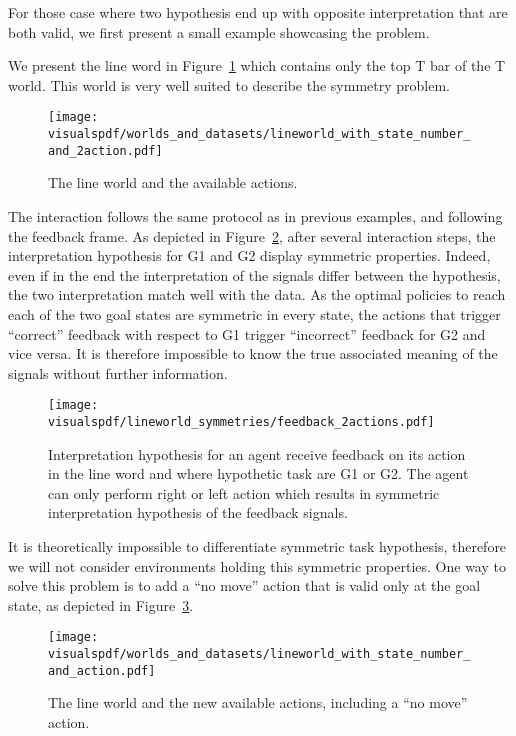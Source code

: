 For those case where two hypothesis end up with opposite interpretation that are both valid, we first present a small example showcasing the problem.

We present the line word in Figure~\ref{fig:lineworld} which contains only the top T bar of the T world. This world is very well suited to describe the symmetry problem. 

\begin{figure}[!htbp]
  \centering
  \texttt{[image: \\visualspdf/worlds\_and\_datasets/lineworld\_with\_state\_number\_and\_2action.pdf]}
  \caption{The line world and the available actions.}
  \label{fig:lineworld}
\end{figure}

The interaction follows the same protocol as in previous examples, and following the feedback frame. As depicted in Figure~\ref{fig:lineworldfeedback2action}, after several interaction steps, the interpretation hypothesis for G1 and G2 display symmetric properties. Indeed, even if in the end the interpretation of the signals differ between the hypothesis, the two interpretation match well with the data. As the optimal policies to reach each of the two goal states are symmetric in every state, the actions that trigger ``correct'' feedback with respect to G1 trigger ``incorrect'' feedback for G2 and vice versa. It is therefore impossible to know the true associated meaning of the signals without further information.

\begin{figure}[!htbp]
  \centering
  \texttt{[image: \\visualspdf/lineworld\_symmetries/feedback\_2actions.pdf]}
  \caption{Interpretation hypothesis for an agent receive feedback on its action in the line word and where hypothetic task are G1 or G2. The agent can only perform right or left action which results in symmetric interpretation hypothesis of the feedback signals.}
  \label{fig:lineworldfeedback2action}
\end{figure}

It is theoretically impossible to differentiate symmetric task hypothesis, therefore we will not consider environments holding this symmetric properties. One way to solve this problem is to add a ``no move'' action that is valid only at the goal state, as depicted in Figure~\ref{fig:lineworld3action}.

\begin{figure}[!htbp]
  \centering
  \texttt{[image: \\visualspdf/worlds\_and\_datasets/lineworld\_with\_state\_number\_and\_action.pdf]}
  \caption{The line world and the new available actions, including a ``no move'' action.}
  \label{fig:lineworld3action}
\end{figure}

